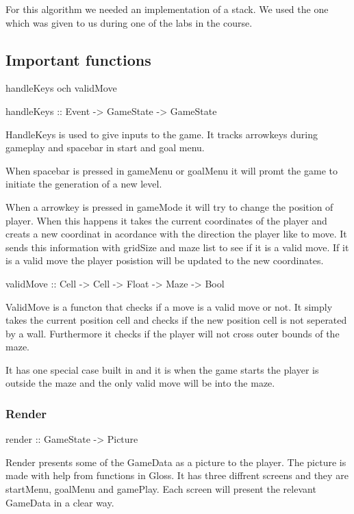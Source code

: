\documentclass[12pt, a4paper]{article}
\begin{document}
For this algorithm we needed an implementation of a stack. We used the one which was given to us during one of the labs in the course. 






\subsection{Important functions}

handleKeys och validMove
\begin{code}
    handleKeys :: Event -> GameState -> GameState
\end{code}

HandleKeys is used to give inputs to the game. It tracks arrowkeys during gameplay and spacebar in start and goal menu.

When spacebar is pressed in gameMenu or goalMenu it will promt the game to initiate the generation of a new level. 

When a arrowkey is pressed in gameMode it will try to change the position of player. When this happens it takes the current coordinates of the player and creats a new coordinat in acordance with the direction the player like to move. It sends this information with gridSize and maze list to see if it is a valid move. If it is a valid move the player posistion will be updated to the new coordinates. 

\begin{code}
    validMove :: Cell -> Cell -> Float -> Maze -> Bool
\end{code}
ValidMove is a functon that checks if a move is a valid move or not. It simply takes the current position cell and checks if the new position cell is not seperated by a wall. 
Furthermore it checks if the player will not cross outer bounds of the maze.

It has one special case built in and it is when the game starts the player is outside the maze and the only valid move will be into the maze.


\subsubsection*{Render}
\begin{code}
    render :: GameState -> Picture
\end{code}
Render presents some of the GameData as a picture to the player. The picture is made with help from functions in Gloss. It has three diffrent screens and they are startMenu, goalMenu and gamePlay. Each screen will present the relevant GameData in a clear way.
\end{document}
